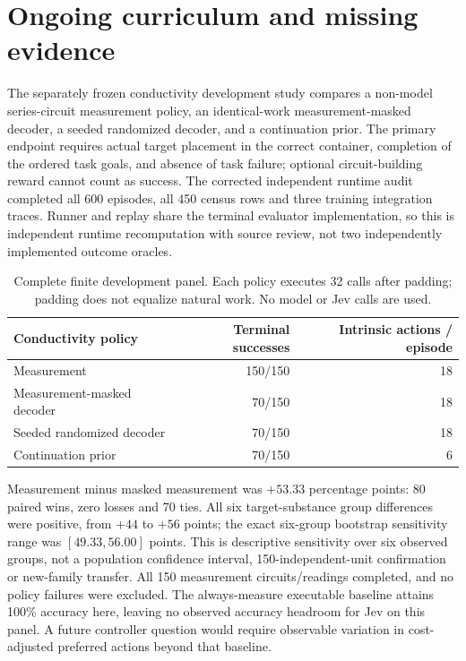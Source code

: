 \documentclass[11pt]{article}
\begin{document}
\section{Ongoing curriculum and missing evidence}
The separately frozen conductivity development study compares a non-model series-circuit measurement policy, an identical-work measurement-masked decoder, a seeded randomized decoder, and a continuation prior. The primary endpoint requires actual target placement in the correct container, completion of the ordered task goals, and absence of task failure; optional circuit-building reward cannot count as success. The corrected independent runtime audit completed all 600 episodes, all 450 census rows and three training integration traces. Runner and replay share the terminal evaluator implementation, so this is independent runtime recomputation with source review, not two independently implemented outcome oracles.

\begin{table}[h]
\centering
\begin{tabular}{lrr}
\toprule
Conductivity policy & Terminal successes & Intrinsic actions / episode\\
\midrule
Measurement & 150/150 & 18\\
Measurement-masked decoder & 70/150 & 18\\
Seeded randomized decoder & 70/150 & 18\\
Continuation prior & 70/150 & 6\\
\bottomrule
\end{tabular}
\caption{Complete finite development panel. Each policy executes 32 calls after padding; padding does not equalize natural work. No model or Jev calls are used.}
\end{table}

Measurement minus masked measurement was $+53.33$ percentage points: 80 paired wins, zero losses and 70 ties. All six target-substance group differences were positive, from $+44$ to $+56$ points; the exact six-group bootstrap sensitivity range was $[49.33,56.00]$ points. This is descriptive sensitivity over six observed groups, not a population confidence interval, 150-independent-unit confirmation or new-family transfer. All 150 measurement circuits/readings completed, and no policy failures were excluded. The always-measure executable baseline attains 100\% accuracy here, leaving no observed accuracy headroom for Jev on this panel. A future controller question would require observable variation in cost-adjusted preferred actions beyond that baseline.
\end{document}
